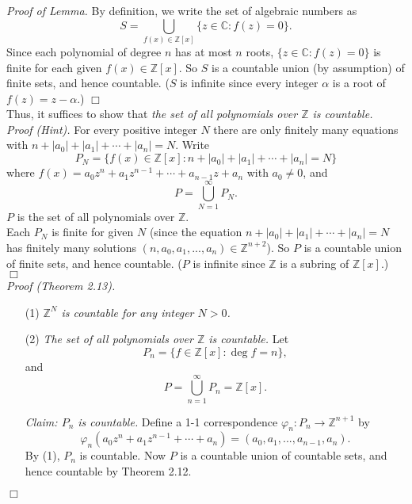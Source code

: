 \documentclass{article}
\begin{document}
\emph{Proof of Lemma.}
By definition, we write the set of algebraic numbers as
$$S = \bigcup_{f(x) \in \mathbb{Z}[x]} \{ z \in \mathbb{C} : f(z) = 0 \}.$$
Since each polynomial of degree $n$ has at most $n$ roots,
$\{ z \in \mathbb{C} : f(z) = 0 \}$ is finite for each given $f(x) \in \mathbb{Z}[x]$.
So $S$ is a countable union (by assumption) of finite sets, and hence countable.
($S$ is infinite since
every integer $\alpha$ is a root of $f(z) = z - \alpha$.)
$\Box$ \\

Thus, it suffices to show that
\emph{the set of all polynomials over $\mathbb{Z}$ is countable.} \\

\emph{Proof (Hint).}
For every positive integer $N$ there are only finitely many equations with
$n + |a_0| + |a_1| + \cdots + |a_n| = N.$
Write
$$P_N = \{ f(x) \in \mathbb{Z}[x] : n + |a_0| + |a_1| + \cdots + |a_n| = N \}$$
where $f(x) = a_0 z^n + a_1 z^{n-1} + \cdots + a_{n-1} z + a_n$ with $a_0 \neq 0$,
and
$$P = \bigcup_{N = 1}^{\infty} P_N.$$
$P$ is the set of all polynomials over $\mathbb{Z}$. \\

Each $P_N$ is finite for given $N$
(since the equation $n + |a_0| + |a_1| + \cdots + |a_n| = N$
has finitely many solutions
$(n, a_0, a_1, ..., a_n) \in \mathbb{Z}^{n+2}$).
So $P$ is a countable union of finite sets, and hence countable.
($P$ is infinite since
$\mathbb{Z}$ is a subring of $\mathbb{Z}[x]$.)
$\Box$ \\

\emph{Proof (Theorem 2.13).}
\begin{enumerate}
\item[(1)]
\emph{$\mathbb{Z}^N$ is countable for any integer $N > 0$.}
\item[(2)]
\emph{The set of all polynomials over $\mathbb{Z}$ is countable.}
Let
$$P_n = \{ f \in \mathbb{Z}[x] : \deg f = n \},$$
and
$$P = \bigcup_{n = 1}^{\infty} P_n = \mathbb{Z}[x].$$

\emph{Claim: $P_n$ is countable.}
Define a 1-1 correspondence $\varphi_n: P_n \rightarrow \mathbb{Z}^{n+1}$ by
$$\varphi_n(a_0 z^n + a_1 z^{n-1} + \cdots + a_n)
= (a_0, a_1, ..., a_{n-1}, a_n).$$
By (1), $P_n$ is countable.
Now $P$ is a countable union of countable sets,
and hence countable by Theorem 2.12.
\end{enumerate}
$\Box$ \\
\end{document}
